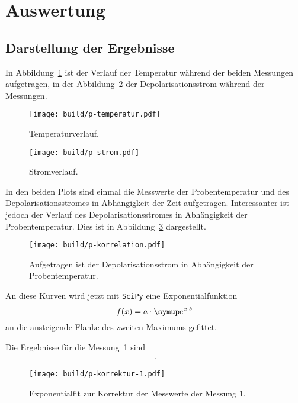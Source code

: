 \section{Auswertung}
\label{sec:Auswertung}
\subsection{Darstellung der Ergebnisse}
In Abbildung~\ref{fig:temperatur} ist der Verlauf der Temperatur
während der beiden Messungen aufgetragen, in der Abbildung~\ref{fig:strom}
der Depolarisationsstrom während der Messungen.

\begin{figure}
  \centering
  \texttt{[image: build/p-temperatur.pdf]}
  \caption{Temperaturverlauf.}
  \label{fig:temperatur}
\end{figure}
\begin{figure}
  \centering
  \texttt{[image: build/p-strom.pdf]}
  \caption{Stromverlauf.}
  \label{fig:strom}
\end{figure}
In den beiden Plots sind einmal die Messwerte der Probentemperatur
und des Depolarisationsstromes in Abhängigkeit der Zeit aufgetragen.
\FloatBarrier
Interessanter ist jedoch der Verlauf des Depolarisationsstromes in Abhängigkeit
der Probentemperatur. Dies ist in Abbildung~\ref{fig:korrelation} dargestellt.

\begin{figure}
  \centering
  \texttt{[image: build/p-korrelation.pdf]}
  \caption{Aufgetragen ist der Depolarisationsstrom in Abhängigkeit der Probentemperatur.}
  \label{fig:korrelation}
\end{figure}

An diese Kurven wird jetzt mit \texttt{SciPy} eine Exponentialfunktion
\begin{equation}
  f\l(x\r) = a \cdot \me^{x \cdot b}
\end{equation}
an die ansteigende Flanke des zweiten Maximums gefittet.

Die Ergebnisse für die Messung~1 sind \\
\begin{align}
   \\
  \,.
\end{align}
\begin{figure}
  \centering
  \texttt{[image: build/p-korrektur-1.pdf]}
  \caption{Exponentialfit zur Korrektur der Messwerte der Messung 1.}
  \label{fig:korrektur-1}
\end{figure}

